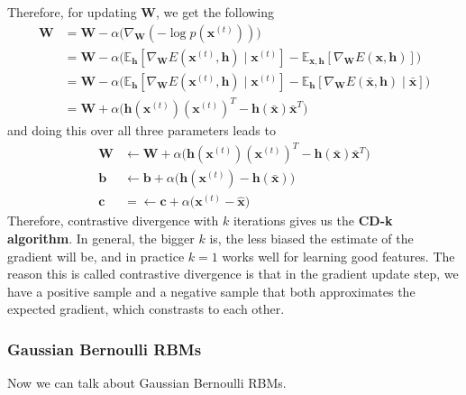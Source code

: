 \documentclass{article}
\begin{document}
      Therefore, for updating $\mathbf{W}$, we get the following 
      \begin{align*} 
        \mathbf{W} & = \mathbf{W} - \alpha \big( \nabla_{\mathbf{W}}(- \log p(\mathbf{x}^{(t)})) \big) \\
                   & = \mathbf{W} - \alpha \big( \mathbb{E}_{\mathbf{h}} [ \nabla_{\mathbf{W}} E(\mathbf{x}^{(t)}, \mathbf{h}) \mid \mathbf{x}^{(t)} ] - \mathbb{E}_{\mathbf{x}, \mathbf{h}} [\nabla_{\mathbf{W}} E(\mathbf{x}, \mathbf{h}) ]\big) \\
                   & = \mathbf{W} - \alpha \big( \mathbb{E}_{\mathbf{h}} [ \nabla_{\mathbf{W}} E(\mathbf{x}^{(t)}, \mathbf{h}) \mid \mathbf{x}^{(t)} ] - \mathbb{E}_{\mathbf{h}} [\nabla_{\mathbf{W}} E(\bar{\mathbf{x}}, \mathbf{h}) \mid \bar{\mathbf{x}} ]\big) \\
                   & = \mathbf{W} + \alpha \big( \mathbf{h}(\mathbf{x}^{(t)}) (\mathbf{x}^{(t)})^T               - \mathbf{h}(\bar{\mathbf{x}}) \bar{\mathbf{x}}^T \big)
      \end{align*}
      and doing this over all three parameters leads to 
      \begin{align*} 
        \mathbf{W} & \leftarrow \mathbf{W} + \alpha \big( \mathbf{h} (\mathbf{x}^{(t)}) (\mathbf{x}^{(t)})^T - \mathbf{h}(\bar{\mathbf{x}}) \bar{\mathbf{x}}^T \big) \\
        \mathbf{b} & \leftarrow \mathbf{b} + \alpha \big( \mathbf{h}(\mathbf{x}^{(t)}) - \mathbf{h}(\bar{\mathbf{x}}) \big) \\
        \mathbf{c} & = \leftarrow \mathbf{c} + \alpha \big( \mathbf{x}^{(t)} - \hat{\mathbf{x}} \big) 
      \end{align*}
      Therefore, contrastive divergence with $k$ iterations gives us the \textbf{CD-k algorithm}. In general, the bigger $k$ is, the less biased the estimate of the gradient will be, and in practice $k=1$ works well for learning good features. The reason this is called contrastive divergence is that in the gradient update step, we have a positive sample and a negative sample that both approximates the expected gradient, which constrasts to each other. 

    \subsubsection{Gaussian Bernoulli RBMs}

      Now we can talk about Gaussian Bernoulli RBMs. 
\end{document}
